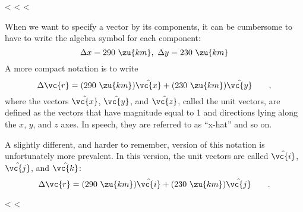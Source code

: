 <%
<%
<%

When we want to specify a vector by its components, it can
be cumbersome to have to write the algebra symbol for each component:
\begin{equation*}
   \Delta x= 290\ \zu{km},\ \Delta y=230\ \zu{km}
\end{equation*}
A more compact notation is to write
\begin{equation*}
        \Delta \vc{r}  =  (290\ \zu{km})\hat{\vc{x}} + (230\ \zu{km})\hat{\vc{y}}   \qquad   ,
\end{equation*}
where the vectors $\hat{\vc{x}}$, $\hat{\vc{y}}$, and $\hat{\vc{z}}$, called the unit vectors, are
defined as the vectors that have magnitude equal to 1 and
directions lying along the $x$, $y$, and $z$ axes. In speech,
they are referred to as ``x-hat'' and so on.

A slightly different, and harder to remember, version of
this notation is unfortunately more prevalent. In this
version, the unit vectors are called $\hat{\vc{i}}$, $\hat{\vc{j}}$, and $\hat{\vc{k}}$:
\begin{equation*}
        \Delta \vc{r}  =  (290\ \zu{km})\hat{\vc{i}} + (230\ \zu{km})\hat{\vc{j}}   \qquad   .
\end{equation*}

<%
<%

